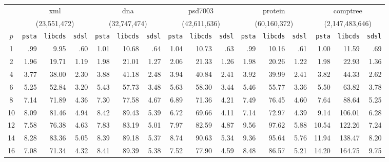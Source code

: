\setcounter{pizzachili}{\value{footnote}}
\setcounter{xmldata}{\value{footnote}}
\setlength{\tabcolsep}{3pt}
\begin{table}[ht]
  \centering
  \begin{tabular}{crrrrrrrrrrrrrrr}
    & \multicolumn{3}{c}{xml} & \multicolumn{3}{c}{dna} & \multicolumn{3}{c}{psd7003} & \multicolumn{3}{c}{protein} & \multicolumn{3}{c}{comptree}\\
    &  \multicolumn{3}{c}{(23,551,472)} & \multicolumn{3}{c}{(32,747,474)} & \multicolumn{3}{c}{(42,611,636)} & \multicolumn{3}{c}{(60,160,372)} & \multicolumn{3}{c}{(2,147,483,646)}\\
\hline
    $p$ & \verb|psta| & \verb|libcds| & \verb|sdsl|  & \verb|psta| & \verb|libcds| & \verb|sdsl| & \verb|psta| & \verb|libcds| & \verb|sdsl| & \verb|psta| & \verb|libcds| & \verb|sdsl| & \verb|psta| & \verb|libcds| & \verb|sdsl|\\
\hline
 1   &  .99  &  9.95  & .60  &  1.01 & 10.68  & .64  &  1.04  & 10.73  & .63  &  .99   &  10.16  &  .61   & 1.00  & 11.59  & .69   \\
 2   &  1.96 &  19.71 & 1.19 &  1.98 & 21.01  & 1.27 &  2.06  & 21.33  & 1.26 &  1.98  &  20.26  &  1.22  & 1.98  & 22.93  & 1.36  \\
 4   &  3.77 &  38.00 & 2.30 &  3.88 & 41.18  & 2.48 &  3.94  & 40.84  & 2.41 &  3.92  &  39.99  &  2.41  & 3.82  & 44.33  & 2.62  \\
 6   &  5.25 &  52.84 & 3.20 &  5.43 & 57.73  & 3.48 &  5.63  & 58.30  & 3.44 &  5.46  &  55.77  &  3.36  & 5.50  & 63.82  & 3.78  \\
 8   &  7.14 &  71.89 & 4.36 &  7.30 & 77.58  & 4.67 &  6.89  & 71.36  & 4.21 &  7.49  &  76.45  &  4.60  & 7.64  & 88.64  & 5.25  \\
 10  &  8.09 &  81.46 & 4.94 &  8.42 & 89.43  & 5.39 &  6.72  & 69.66  & 4.11 &  7.14  &  72.97  &  4.39  & 9.14  & 106.01 & 6.28  \\
 12  &  7.58 &  76.38 & 4.63 &  7.83 & 83.19  & 5.01 &  7.97  & 82.59  & 4.87 &  9.56  &  97.62  &  5.88  & 10.54 & 122.26 & 7.24  \\
 14  &  8.28 &  83.36 & 5.05 &  8.39 & 89.18  & 5.37 &  8.74  & 90.63  & 5.34 &  9.36  &  95.64  &  5.76  & 11.94 & 138.47 & 8.20  \\
 16  &  7.08 &  71.34 & 4.32 &  8.41 & 89.39  & 5.38 &  7.52  & 77.90  & 4.59 &  8.48  &  86.57  &  5.21  & 14.20 & 164.75 & 9.75  \\

\end{tabular}
\end{table}
